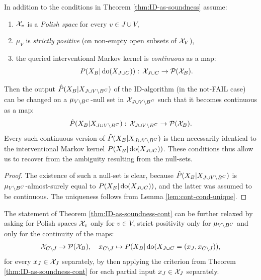 \begin{Thm}
    \label{thm:ID-as-soundness-cont}
    In addition to the conditions in Theorem \ref{thm:ID-as-soundness} assume:
          \begin{enumerate}
              \item $\mathcal{X}_v$ is a \emph{Polish space} for every $v \in J \cup V$,
              \item $\mu_{V}$ is \emph{strictly positive} (on non-empty open subsets of $\mathcal{X}_V$),
              \item the queried interventional Markov kernel is \emph{continuous} as a map:
                  \[ P(X_B|\operatorname{do}(X_{J \cup C})):\, \mathcal{X}_{J \cup C} \to \mathcal{P}(\mathcal{X}_B).\]
          \end{enumerate}
          Then the output $\hat P(X_B|X_{J \cup V \setminus B^C})$ of the ID-algorithm (in the not-FAIL case) 
          can be changed on a $\mu_{V\setminus B^C}$-null set in $\mathcal{X}_{J \cup V \setminus B^C}$ such that it becomes continuous as a map:
        \[ \hat P(X_B|X_{J \cup V \setminus B^C}):\, \mathcal{X}_{J \cup V \setminus B^C} \to \mathcal{P}(\mathcal{X}_B). \]
          Every such continuous version of $\hat P(X_B|X_{J \cup V \setminus B^C})$ is then necessarily identical to
          the interventional Markov kernel $P(X_B|\operatorname{do}(X_{J \cup C}))$. 
          These conditions thus allow us to recover from the ambiguity resulting from the null-sets.
          \begin{proof}
              The existence of such a null-set is clear, 
              because $\hat P(X_B|X_{J \cup V \setminus B^C})$ is $\mu_{V\setminus B^C}$-almost-surely equal to
              $P(X_B|\operatorname{do}(X_{J \cup C}))$, and the latter was assumed to be continuous.
              The uniqueness follows from Lemma \ref{lem:cont-cond-unique}.
          \end{proof}
\end{Thm}

\begin{Rem}
    The statement of Theorem \ref{thm:ID-as-soundness-cont} 
    can be further relaxed by asking for Polish spaces $\mathcal{X}_v$ only for $v \in V$,
          strict positivity only for $\mu_{V\setminus B^C}$ and only for the continuity of the maps:
          \[  \mathcal{X}_{C \setminus J} \to \mathcal{P}(\mathcal{X}_B),\quad x_{C\setminus J} \mapsto P(X_B|\operatorname{do}(X_{J \cup C}=(x_J,x_{C \setminus J})), \]
          for every $x_J \in \mathcal{X}_J$ separately, by then applying the criterion from Theorem \ref{thm:ID-as-soundness-cont} 
          for each partial input $x_J\in \mathcal{X}_J$ separately.
\end{Rem}


